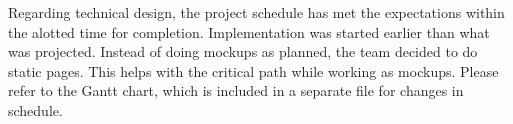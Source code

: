 

Regarding technical design, the project schedule has met the expectations within
the alotted time for completion. Implementation was started earlier than what
was projected. Instead of doing mockups as planned, the team decided to do
static pages. This helps with the critical path while working as mockups. Please
refer to the Gantt chart, which is included in a separate file for changes in
schedule.

